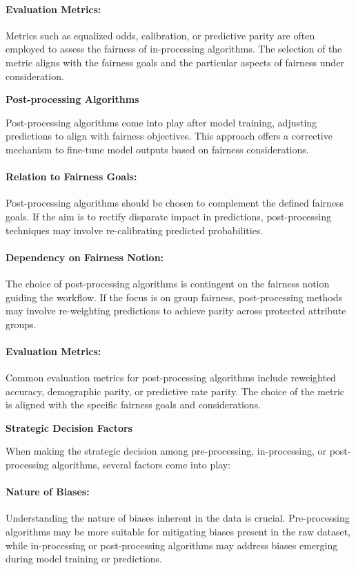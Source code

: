 \paragraph{Evaluation Metrics:}
Metrics such as equalized odds, calibration, or predictive parity are often employed to assess the fairness of in-processing algorithms. The selection of the metric aligns with the fairness goals and the particular aspects of fairness under consideration.

\textbf{Post-processing Algorithms}

Post-processing algorithms come into play after model training, adjusting predictions to align with fairness objectives. This approach offers a corrective mechanism to fine-tune model outputs based on fairness considerations.

\paragraph{Relation to Fairness Goals:}
Post-processing algorithms should be chosen to complement the defined fairness goals. If the aim is to rectify disparate impact in predictions, post-processing techniques may involve re-calibrating predicted probabilities.

\paragraph{Dependency on Fairness Notion:}
The choice of post-processing algorithms is contingent on the fairness notion guiding the workflow. If the focus is on group fairness, post-processing methods may involve re-weighting predictions to achieve parity across protected attribute groups.

\paragraph{Evaluation Metrics:}
Common evaluation metrics for post-processing algorithms include reweighted accuracy, demographic parity, or predictive rate parity. The choice of the metric is aligned with the specific fairness goals and considerations.

\textbf{Strategic Decision Factors}

When making the strategic decision among pre-processing, in-processing, or post-processing algorithms, several factors come into play:

\paragraph{Nature of Biases:}
Understanding the nature of biases inherent in the data is crucial. Pre-processing algorithms may be more suitable for mitigating biases present in the raw dataset, while in-processing or post-processing algorithms may address biases emerging during model training or predictions.

